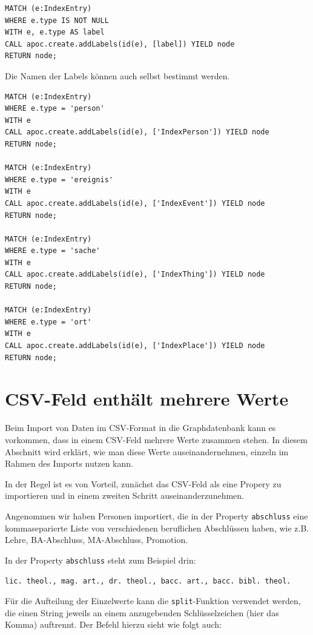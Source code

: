 \documentclass[ngerman,]{scrreprt}
\begin{document}
\begin{verbatim}
MATCH (e:IndexEntry)
WHERE e.type IS NOT NULL
WITH e, e.type AS label
CALL apoc.create.addLabels(id(e), [label]) YIELD node
RETURN node;
\end{verbatim}

Die Namen der Labels können auch selbst bestimmt werden.

\begin{verbatim}
MATCH (e:IndexEntry)
WHERE e.type = 'person'
WITH e
CALL apoc.create.addLabels(id(e), ['IndexPerson']) YIELD node
RETURN node;

MATCH (e:IndexEntry)
WHERE e.type = 'ereignis'
WITH e
CALL apoc.create.addLabels(id(e), ['IndexEvent']) YIELD node
RETURN node;

MATCH (e:IndexEntry)
WHERE e.type = 'sache'
WITH e
CALL apoc.create.addLabels(id(e), ['IndexThing']) YIELD node
RETURN node;

MATCH (e:IndexEntry)
WHERE e.type = 'ort'
WITH e
CALL apoc.create.addLabels(id(e), ['IndexPlace']) YIELD node
RETURN node;
\end{verbatim}

\section{CSV-Feld enthält mehrere Werte}\label{csv-feld-enthuxe4lt-mehrere-werte}

Beim Import von Daten im CSV-Format in die Graphdatenbank kann es vorkommen, dass in einem CSV-Feld mehrere Werte zusammen stehen. In diesem Abschnitt wird erklärt, wie man diese Werte auseinandernehmen, einzeln im Rahmen des Imports nutzen kann.

In der Regel ist es von Vorteil, zunächst das CSV-Feld als eine Propery zu importieren und in einem zweiten Schritt auseinanderzunehmen.

Angenommen wir haben Personen importiert, die in der Property \texttt{abschluss} eine kommaseparierte Liste von verschiedenen beruflichen Abschlüssen haben, wie z.B. Lehre, BA-Abschluss, MA-Abschluss, Promotion.

In der Property \texttt{abschluss} steht zum Beispiel drin:

\texttt{lic.\ theol.,\ mag.\ art.,\ dr.\ theol.,\ bacc.\ art.,\ bacc.\ bibl.\ theol.}

Für die Aufteilung der Einzelwerte kann die \texttt{split}-Funktion verwendet werden, die einen String jeweils an einem anzugebenden Schlüsselzeichen (hier das Komma) auftrennt. Der Befehl hierzu sieht wie folgt auch:
\end{document}
